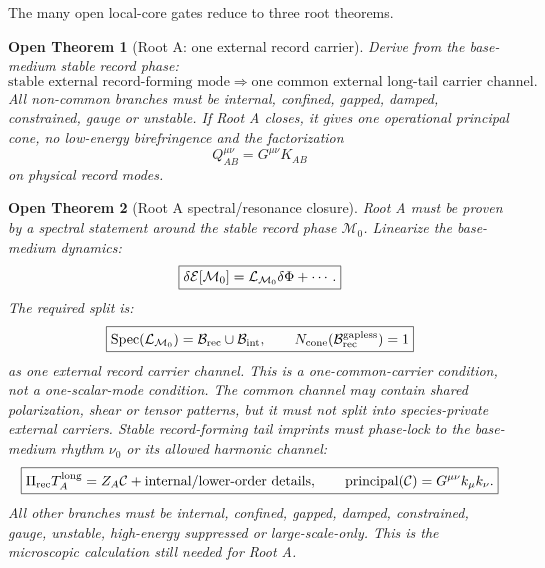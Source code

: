 \documentclass[11pt]{article}
\newtheorem{openthm}{Open Theorem}
\begin{document}
The many open local-core gates reduce to three root theorems.

\begin{openthm}[Root A: one external record carrier]
Derive from the base-medium stable record phase:
\[
\boxed{
\text{stable external record-forming mode}
\Rightarrow
\text{one common external long-tail carrier channel}.
}
\]
All non-common branches must be internal, confined, gapped, damped,
constrained, gauge or unstable.  If Root A closes, it gives one operational
principal cone, no low-energy birefringence and the factorization
\[
\boxed{
Q_{AB}^{\mu\nu}=G^{\mu\nu}K_{AB}
}
\]
on physical record modes.
\end{openthm}

\begin{openthm}[Root A spectral/resonance closure]
Root A must be proven by a spectral statement around the stable record phase
\(\mathcal M_0\).  Linearize the base-medium dynamics:
\[
\boxed{
\delta{\cal E}[\mathcal M_0]
=
{\cal L}_{\mathcal M_0}\delta\Phi+\cdots.
}
\]
The required split is:
\[
\boxed{
\mathrm{Spec}({\cal L}_{\mathcal M_0})
=
{\cal B}_{\rm rec}
\cup
{\cal B}_{\rm int},
\qquad
N_{\rm cone}({\cal B}_{\rm rec}^{\rm gapless})=1
}
\]
as one external record carrier channel.  This is a one-common-carrier condition,
not a one-scalar-mode condition.  The common channel may contain shared
polarization, shear or tensor patterns, but it must not split into
species-private external carriers.  Stable record-forming tail imprints must
phase-lock to the base-medium rhythm \(\nu_0\) or its allowed harmonic channel:
\[
\boxed{
\Pi_{\rm rec}T_A^{\rm long}
=
Z_A\mathcal C+\hbox{internal/lower-order details},
\qquad
\operatorname{principal}(\mathcal C)
=
G^{\mu\nu}k_\mu k_\nu.
}
\]
All other branches must be internal, confined, gapped, damped, constrained,
gauge, unstable, high-energy suppressed or large-scale-only.  This is the
microscopic calculation still needed for Root A.


\end{openthm}
\end{document}
